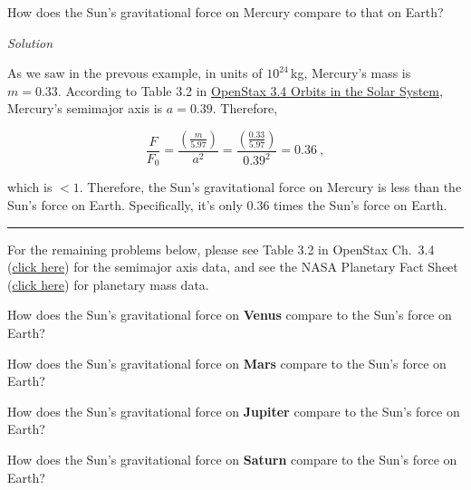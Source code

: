 \documentclass{article}
\begin{document}
\begin{example}
How does the Sun's gravitational force on Mercury compare to that on Earth?

\textit{Solution}

As we saw in the prevous example, in units of $10^{24}\,$kg, Mercury's mass is $m=0.33$. According to Table 3.2 in \href{https://openstax.org/books/astronomy-2e/pages/3-4-orbits-in-the-solar-system}{OpenStax 3.4 Orbits in the Solar System}, Mercury's semimajor axis is $a = 0.39$. Therefore, 

\begin{equation*}
    \frac{F}{F_0} = \frac{\left(\frac{m}{5.97}\right)}{a^2} = \frac{\left(\frac{0.33}{5.97}\right)}{0.39^2} = 0.36\ ,
\end{equation*}

which is $<1$. Therefore, the Sun's gravitational force on Mercury is less than the Sun's force on Earth. Specifically, it's only 0.36 times the Sun's force on Earth.
\end{example}

\hrule

\begin{mdframed}[backgroundcolor=red!20]
For the remaining problems below, please see Table 3.2 in OpenStax Ch.~3.4 (\href{https://openstax.org/books/astronomy-2e/pages/3-4-orbits-in-the-solar-system}{click here}) for the semimajor axis data, and see the NASA Planetary Fact Sheet (\href{https://nssdc.gsfc.nasa.gov/planetary/factsheet/}{click here}) for planetary mass data.
\end{mdframed}

\begin{problem}
How does the Sun's gravitational force on \textbf{Venus} compare to the Sun's force on Earth? 
\end{problem}

\begin{problem}
How does the Sun's gravitational force on \textbf{Mars} compare to the Sun's force on Earth? 
\end{problem}

\begin{problem}
How does the Sun's gravitational force on \textbf{Jupiter} compare to the Sun's force on Earth? 
\end{problem}

\begin{problem}
How does the Sun's gravitational force on \textbf{Saturn} compare to the Sun's force on Earth? 
\end{problem}
\end{document}
